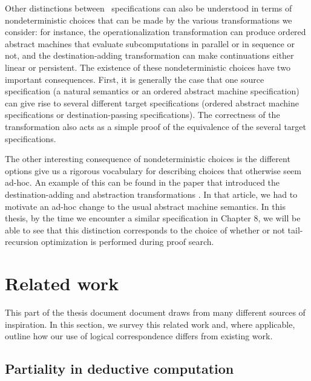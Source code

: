 Other distinctions between \sls~specifications can also be understood
in terms of nondeterministic choices that can be made by the various
transformations we consider: for instance, the operationalization
transformation can produce ordered abstract machines that evaluate
subcomputations in parallel or in sequence or not, and the
destination-adding transformation can make continuations either linear
or persistent. The existence of these nondeterministic choices have two
important consequences. First, it is generally the case that one source
specification (a natural semantics or an ordered abstract machine
specification) can give rise to several different target
specifications (ordered abstract machine specifications or
destination-passing specifications). The correctness of the
transformation also acts as a simple proof of the equivalence of the
several target specifications.

The other interesting consequence of nondeterministic choices is the
different options give us a rigorous vocabulary for describing choices
that otherwise seem ad-hoc. An example of this can be found in the
paper that introduced the destination-adding and abstraction
transformations \cite{simmons11logical}. In that article, we had to
motivate an ad-hoc change to the usual abstract machine semantics. In
this thesis, by the time we encounter a similar specification in
Chapter 8, we will be able to see that this distinction corresponds to
the choice of whether or not tail-recursion optimization is performed
during proof search.

\section{Related work}

This part of the thesis document document draws from many different
sources of inspiration. In this section, we survey this related work
and, where applicable, outline how our use of logical correspondence
differs from existing work.

\subsection{Partiality in deductive computation}

